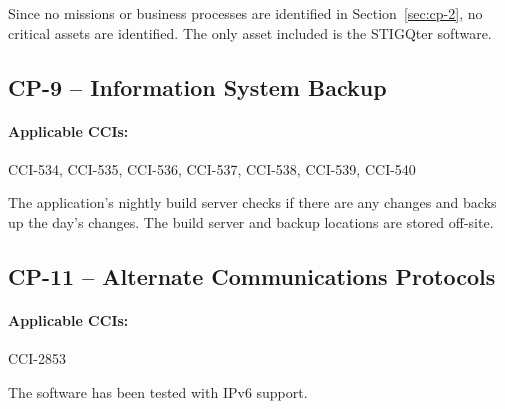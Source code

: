\documentclass[letterpaper, 10pt, twoside]{article}
\begin{document}
Since no missions or business processes are identified in Section~\ref{sec:cp-2}, no critical assets are identified. The only asset included is the STIGQter software.

\subsection{CP-9 -- Information System Backup}

\paragraph{Applicable CCIs:} CCI-534, CCI-535, CCI-536, CCI-537, CCI-538, CCI-539, CCI-540

The application's nightly build server checks if there are any changes and backs up the day's changes. The build server and backup locations are stored off-site.

\subsection{CP-11 -- Alternate Communications Protocols}

\paragraph{Applicable CCIs:} CCI-2853

The software has been tested with IPv6 support.

\clearpage
\printbibliography
\end{document}
